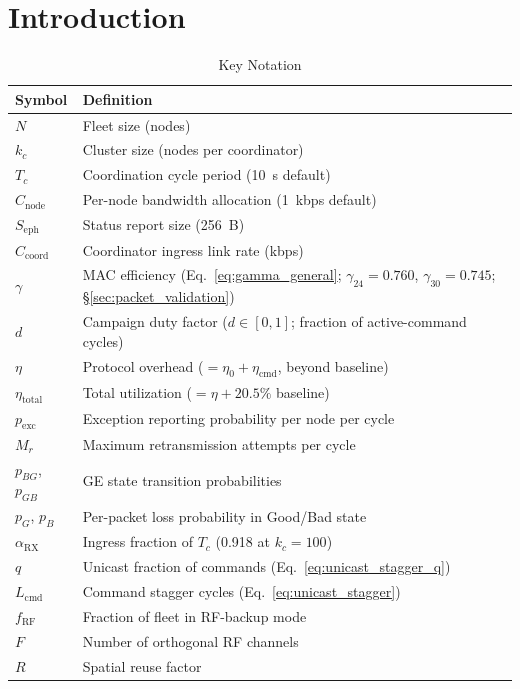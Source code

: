 \documentclass[journal]{IEEEtran}
\begin{document}
\section{Introduction}

\begin{table}[t]
    \centering
    \caption{Key Notation}
    \label{tab:notation}
    \begin{tabular}{@{}ll@{}}
        \toprule
        \textbf{Symbol} & \textbf{Definition} \\
        \midrule
        $N$ & Fleet size (nodes) \\
        $k_c$ & Cluster size (nodes per coordinator) \\
        $T_c$ & Coordination cycle period (10~s default) \\
        $C_{\text{node}}$ & Per-node bandwidth allocation (1~kbps default) \\
        $S_{\text{eph}}$ & Status report size (256~B) \\
        $C_{\text{coord}}$ & Coordinator ingress link rate (kbps) \\
        $\gamma$ & MAC efficiency (Eq.~\ref{eq:gamma_general}; $\gamma_{24} = 0.760$, $\gamma_{30} = 0.745$; \S\ref{sec:packet_validation}) \\
        $d$ & Campaign duty factor ($d \in [0,1]$; fraction of active-command cycles) \\
        $\eta$ & Protocol overhead ($= \eta_0 + \eta_{\text{cmd}}$, beyond baseline) \\
        $\eta_{\text{total}}$ & Total utilization ($= \eta + 20.5\%$ baseline) \\
        $p_{\text{exc}}$ & Exception reporting probability per node per cycle \\
        $M_r$ & Maximum retransmission attempts per cycle \\
        $p_{BG}$, $p_{GB}$ & GE state transition probabilities \\
        $p_G$, $p_B$ & Per-packet loss probability in Good/Bad state \\
        $\alpha_{\text{RX}}$ & Ingress fraction of $T_c$ (0.918 at $k_c = 100$) \\
        $q$ & Unicast fraction of commands (Eq.~\ref{eq:unicast_stagger_q}) \\
        $L_{\text{cmd}}$ & Command stagger cycles (Eq.~\ref{eq:unicast_stagger}) \\
        $f_{\text{RF}}$ & Fraction of fleet in RF-backup mode \\
        $F$ & Number of orthogonal RF channels \\
        $R$ & Spatial reuse factor \\
        \bottomrule
    \end{tabular}
\end{table}
\end{document}
